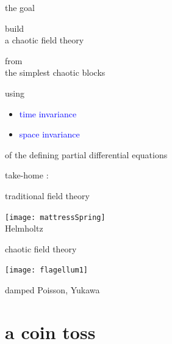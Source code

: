 \begin{frame}{the goal}
\vfill

\begin{center}
{\Large build
\\
a chaotic field theory
\medskip

from
\\
the simplest chaotic blocks}
\end{center}

\vfill
using
\begin{itemize}
  \item
\textcolor{blue}{time invariance}
  \item
\textcolor{blue}{space invariance}
\end{itemize}
 of the defining partial differential equations
\end{frame}

\begin{frame}{take-home :   }
\begin{center}
            \begin{minipage}[c]{0.40\textwidth}\begin{center}
traditional field theory
\bigskip

\texttt{[image: mattressSpring]}\\
{\color{blue}Helmholtz}
            \end{center}\end{minipage}
            \hspace{2ex}
            \begin{minipage}[c]{0.46\textwidth}\begin{center}
chaotic field theory\\
\bigskip
\bigskip
\bigskip

\texttt{[image: flagellum1]}\\
\bigskip

damped {\color{blue}Poisson},  {\color{blue}Yukawa}
            \end{center}\end{minipage}
\end{center}
\end{frame}

\section[a coin toss]
 {a coin toss}

